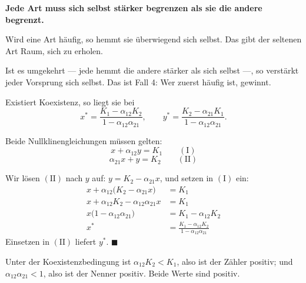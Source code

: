 \begin{merksatz}
\begin{center}
\begin{minipage}{0.9\textwidth}
\textbf{Jede Art muss sich selbst stärker begrenzen als sie die andere begrenzt.}
\end{minipage}
\end{center}

Wird eine Art häufig, so hemmt sie überwiegend sich selbst. Das gibt der seltenen Art Raum, sich zu erholen.

Ist es umgekehrt --- jede hemmt die andere stärker als sich selbst ---, so verstärkt jeder Vorsprung sich selbst. Das ist Fall 4: Wer zuerst häufig ist, gewinnt.

\begin{center}
\begin{minipage}{0.88\textwidth}
\end{minipage}
\end{center}
\end{merksatz}

\begin{merksatz}
Existiert Koexistenz, so liegt sie bei
\[ x^{*} = \frac{K_1 - \alpha_{12}K_2}{1 - \alpha_{12}\alpha_{21}}, \qquad y^{*} = \frac{K_2 - \alpha_{21}K_1}{1 - \alpha_{12}\alpha_{21}} . \]

Beide Nullklinengleichungen müssen gelten:
\[ x + \alpha_{12}y = K_1 \qquad (\mathrm{I}) \]
\[ \alpha_{21}x + y = K_2 \qquad (\mathrm{II}) \]

Wir lösen $(\mathrm{II})$ nach $y$ auf: $y = K_2 - \alpha_{21}x$, und setzen in $(\mathrm{I})$ ein:
\begin{align*}
x + \alpha_{12}\bigl(K_2 - \alpha_{21}x\bigr) &= K_1\\
x + \alpha_{12}K_2 - \alpha_{12}\alpha_{21}x &= K_1\\
x\bigl(1 - \alpha_{12}\alpha_{21}\bigr) &= K_1 - \alpha_{12}K_2\\
x^{*} &= \frac{K_1 - \alpha_{12}K_2}{1 - \alpha_{12}\alpha_{21}}
\end{align*}
Einsetzen in $(\mathrm{II})$ liefert $y^{*}$. $\blacksquare$

Unter der Koexistenzbedingung ist $\alpha_{12}K_2 < K_1$, also ist der Zähler positiv; und $\alpha_{12}\alpha_{21} < 1$, also ist der Nenner positiv. Beide Werte sind positiv. \checkmark
\end{merksatz}

